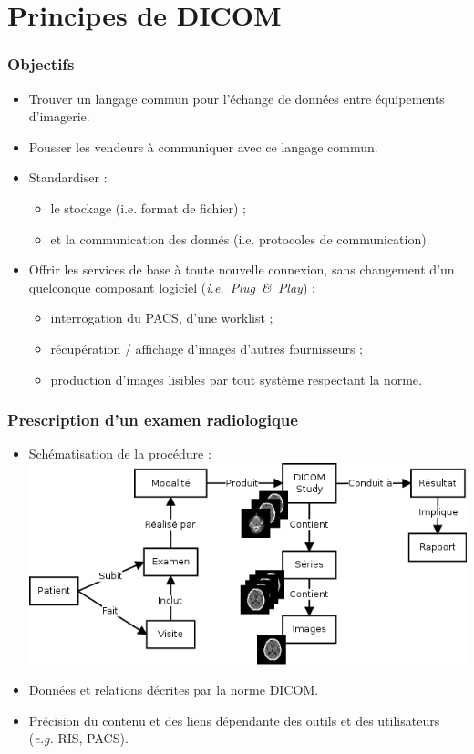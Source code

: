 \section{Principes de DICOM}

	\frame
	{
		\frametitle{Objectifs}
		\begin{itemize}
			\item Trouver un langage commun pour l'\'echange de donn\'ees entre \'equipements d'imagerie.
			\item Pousser les vendeurs \`a communiquer avec ce langage commun.
			\item Standardiser :
			\begin{itemize}
				\item le stockage (i.e. format de fichier) ;
				\item et la communication des donn\'es (i.e. protocoles de communication).
			\end{itemize}
			\item Offrir les services de base \`a toute nouvelle connexion, sans changement d'un quelconque composant logiciel (\emph{i.e.~Plug~\&~Play}) :
    			\begin{itemize}
        				\item interrogation du PACS, d'une worklist ;
        				\item r\'ecup\'eration / affichage d'images d'autres fournisseurs ;
        				\item production d'images lisibles par tout syst\`eme respectant la norme.
        			\end{itemize}
		\end{itemize}
	}

	\frame
	{
		\frametitle{Prescription d'un examen radiologique}
		\begin{itemize}
			\item Sch\'ematisation de la proc\'edure :
			\includegraphics[width=\linewidth]{./figures/scenario.png}
			\item Donn\'ees et relations d\'ecrites par la norme DICOM.
			\item Pr\'ecision du contenu et des liens d\'ependante des outils et des utilisateurs (\emph{e.g.} RIS, PACS).
		\end{itemize}
	}

